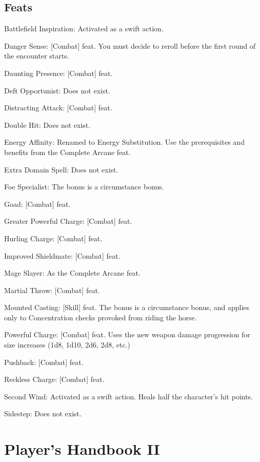 \subsection{Feats}
\begin{itemize*}
\item Battlefield Inspiration: Activated as a swift action.
\item Danger Sense: [Combat] feat. You must decide to reroll before the first round of the encounter starts.
\item Daunting Presence: [Combat] feat.
\item Deft Opportunist: Does not exist.
\item Distracting Attack: [Combat] feat.
\item Double Hit: Does not exist.
\item Energy Affinity: Renamed to Energy Substitution. Use the prerequisites and benefits from the Complete Arcane feat.
\item Extra Domain Spell: Does not exist.
\item Foe Specialist: The bonus is a circumstance bonus.
\item Goad: [Combat] feat.
\item Greater Powerful Charge: [Combat] feat.
\item Hurling Charge: [Combat] feat.
\item Improved Shieldmate: [Combat] feat.
\item Mage Slayer: As the Complete Arcane feat.
\item Martial Throw: [Combat] feat.
\item Mounted Casting: [Skill] feat. The bonus is a circumstance bonus, and applies only to Concentration checks provoked from riding the horse.
\item Powerful Charge: [Combat] feat. Uses the new weapon damage progression for size increases (1d8, 1d10, 2d6, 2d8, etc.)
\item Pushback: [Combat] feat.
\item Reckless Charge: [Combat] feat.
\item Second Wind: Activated as a swift action. Heals half the character's hit points.
\item Sidestep: Does not exist.
\end{itemize*}

\section{Player's Handbook II}
